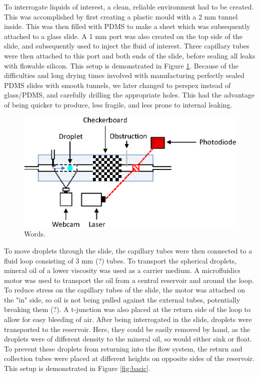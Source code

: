 \documentclass{physics_article_B}
\begin{document}
        To interrogate liquids of interest, a clean, reliable environment had to be created. This was accomplished by first creating a plastic mould with a 2 mm tunnel inside. This was then filled with PDMS to make a sheet which was subsequently attached to a glass slide. A 1 mm port was also created on the top side of the slide, and subsequently used to inject the fluid of interest. Three capillary tubes were then attached to this port and both ends of the slide, before sealing all leaks with flowable silicon. This setup is demonstrated in Figure \ref{fig:control}. Because of the difficulties and long drying times involved with manufacturing perfectly sealed PDMS slides with smooth tunnels, we later changed to perspex instead of glass/PDMS, and carefully drilling the appropriate holes. This had the advantage of being quicker to produce, less fragile, and less prone to internal leaking. \\
        
        \begin{figure}[H]
        \centering
        \hspace*{2cm}\includegraphics[scale=0.9]{Figures/Control.eps}
        \captionsetup{justification=centering}
        \caption{Words.} 	
        \label{fig:control}
        \end{figure} 
    
        To move droplets through the slide, the capillary tubes were then connected to a fluid loop consisting of 3 mm (?) tubes. To transport the spherical droplets, mineral oil of a lower viscosity was used as a carrier medium. A microfluidics motor was used to transport the oil from a central reservoir and around the loop. To reduce stress on the capillary tubes of the slide, the motor was attached on the "in" side, so oil is not being pulled against the external tubes, potentially breaking them (?). A t-junction was also placed at the return side of the loop to allow for easy bleeding of air. After being interrogated in the slide, droplets were transported to the reservoir. Here, they could be easily removed by hand, as the droplets were of different density to the mineral oil, so would either sink or float. To prevent these droplets from returning into the flow system, the return and collection tubes were placed at different heights on opposite sides of the reservoir. This setup is demonstrated in Figure \ref{fig:basic}.
        
\end{document}
